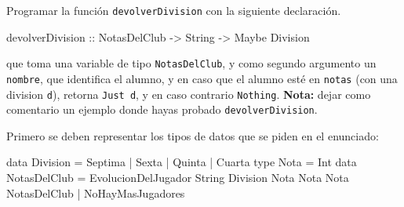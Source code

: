 \documentclass{article}
\begin{document}
\begin{problem}{3}
    Programar la función \texttt{devolverDivision} con la siguiente declaración.
    \begin{haskell}
        devolverDivision :: NotasDelClub -> String -> Maybe Division
    \end{haskell}
    que toma una variable de tipo \texttt{NotasDelClub}, y como segundo argumento un \texttt{nombre}, que identifica el alumno, y en caso que el alumno esté en \texttt{notas} (con una division \texttt{d}), retorna \texttt{Just d}, y en caso contrario \texttt{Nothing}.
    \textbf{Nota:} dejar como comentario un ejemplo donde hayas probado \texttt{devolverDivision}.
\end{problem}

Primero se deben representar los tipos de datos que se piden en el enunciado:
\begin{haskell}
data Division = Septima | Sexta | Quinta | Cuarta  
type Nota = Int
data NotasDelClub = EvolucionDelJugador String Division Nota Nota Nota NotasDelClub | NoHayMasJugadores
\end{haskell}
\end{document}
